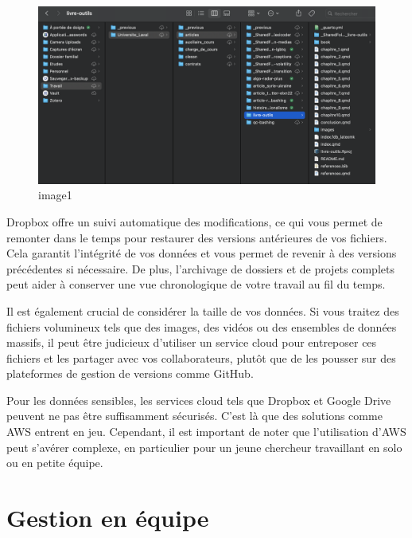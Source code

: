 \documentclass[
  letterpaper,
]{scrbook}
\begin{document}
\begin{figure}

{\centering \includegraphics{images/chapitre8_dropbox.png}

}

\caption{image1}

\end{figure}

Dropbox offre un suivi automatique des modifications, ce qui vous permet
de remonter dans le temps pour restaurer des versions antérieures de vos
fichiers. Cela garantit l'intégrité de vos données et vous permet de
revenir à des versions précédentes si nécessaire. De plus, l'archivage
de dossiers et de projets complets peut aider à conserver une vue
chronologique de votre travail au fil du temps.

Il est également crucial de considérer la taille de vos données. Si vous
traitez des fichiers volumineux tels que des images, des vidéos ou des
ensembles de données massifs, il peut être judicieux d'utiliser un
service cloud pour entreposer ces fichiers et les partager avec vos
collaborateurs, plutôt que de les pousser sur des plateformes de gestion
de versions comme GitHub.

Pour les données sensibles, les services cloud tels que Dropbox et
Google Drive peuvent ne pas être suffisamment sécurisés. C'est là que
des solutions comme AWS entrent en jeu. Cependant, il est important de
noter que l'utilisation d'AWS peut s'avérer complexe, en particulier
pour un jeune chercheur travaillant en solo ou en petite équipe.

\hypertarget{gestion-en-uxe9quipe}{%
\section{Gestion en équipe}\label{gestion-en-uxe9quipe}}
\end{document}
